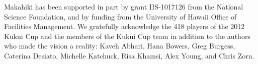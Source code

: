 \documentclass{acm_proc_article-sp}
\begin{document}
Makahiki has been supported in part by grant IIS-1017126 from the National
Science Foundation, and by funding from the University of Hawaii Office of
Facilities Management.   We gratefully acknowledge the 418 players of the 2012
Kukui Cup and the members of the Kukui Cup team in addition to the authors who
made the vision a reality:  Kaveh Abhari, Hana Bowers, Greg Burgess, Caterina
Desiato, Michelle Kat\-chuck, Risa Khamsi, Alex Young, and Chris Zorn.


  

\balancecolumns
\end{document}
